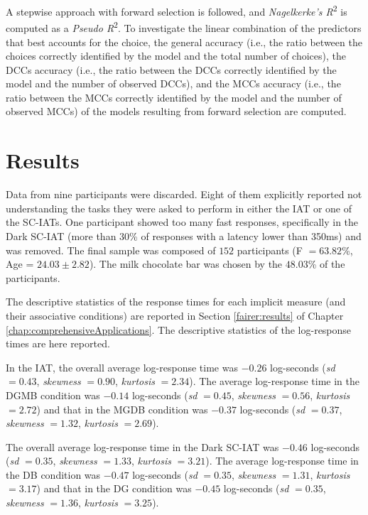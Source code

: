\documentclass[12pt]{book}
\begin{document}
A stepwise approach with forward selection is followed, and \emph{Nagelkerke's R}\textsuperscript{2} \cite{nagel} is computed as a \emph{Pseudo R}\textsuperscript{2}. 
To investigate the linear combination of the predictors that best accounts for the choice, the general accuracy (i.e., the ratio between the choices correctly identified by the model and the total number of choices), the DCCs accuracy (i.e., the ratio between the DCCs correctly identified by the model and the number of observed DCCs), and the MCCs accuracy (i.e., the ratio between the MCCs correctly identified by the model and the number of observed MCCs) of the models resulting from forward selection are computed. 

\section{Results}
Data from nine participants were discarded. Eight of them explicitly reported not understanding the tasks they were asked to perform in either the IAT or one of the SC-IATs. One participant showed too many fast responses, specifically in the Dark SC-IAT (more than $30$\% of responses with a latency lower than 350ms) and was removed. The final sample was composed of $152$ participants (F $= 63.82$\%, Age = $24.03 \pm 2.82$). The milk chocolate bar was chosen by the $48.03$\% of the participants.

The descriptive statistics of the response times for each implicit measure (and their associative conditions) are reported in Section \ref{fairer:results} of Chapter \ref{chap:comprehensiveApplications}. The descriptive statistics of the log-response times are here reported.

In the IAT, the overall average log-response time was $-0.26$ log-seconds (\emph{sd} $= 0.43$, \emph{skewness} $= 0.90$, \emph{kurtosis} $= 2.34$). The average log-response time in the DGMB condition was $-0.14$ log-seconds (\emph{sd} $= 0.45$, \emph{skewness} $= 0.56$, \emph{kurtosis} $= 2.72$) and that in the MGDB condition was $-0.37$ log-seconds (\emph{sd} $= 0.37$, \emph{skewness} $= 1.32$, \emph{kurtosis} $= 2.69$). 

The overall average log-response time in the Dark SC-IAT was $-0.46$ log-seconds (\emph{sd} $= 0.35$, \emph{skewness} $= 1.33$, \emph{kurtosis} $= 3.21$). The average log-response time in the DB condition was $-0.47$ log-seconds (\emph{sd} $= 0.35$, \emph{skewness} $= 1.31$, \emph{kurtosis} $= 3.17$) and that in the DG condition was $-0.45$ log-seconds (\emph{sd} $= 0.35$, \emph{skewness} $= 1.36$, \emph{kurtosis} $= 3.25$). 
\end{document}
